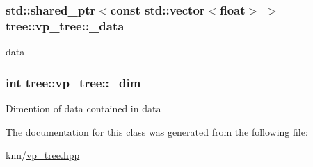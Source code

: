 \subsubsection[{\+\_\+data}]{\setlength{\rightskip}{0pt plus 5cm}std\+::shared\+\_\+ptr$<$const std\+::vector$<$float$>$ $>$ tree\+::vp\+\_\+tree\+::\+\_\+data\hspace{0.3cm}{\ttfamily [protected]}}\label{classtree_1_1vp__tree_ad53d34e7a1648e2b5f88ae2c66e6a44d}
data \hypertarget{classtree_1_1vp__tree_a1c99c8567c9aa156be0f2a77487bab74}{}
\subsubsection[{\+\_\+dim}]{\setlength{\rightskip}{0pt plus 5cm}int tree\+::vp\+\_\+tree\+::\+\_\+dim\hspace{0.3cm}{\ttfamily [protected]}}\label{classtree_1_1vp__tree_a1c99c8567c9aa156be0f2a77487bab74}
Dimention of data contained in data 

The documentation for this class was generated from the following file\+:\begin{DoxyCompactItemize}
\item 
knn/\hyperlink{vp__tree_8hpp}{vp\+\_\+tree.\+hpp}\end{DoxyCompactItemize}
